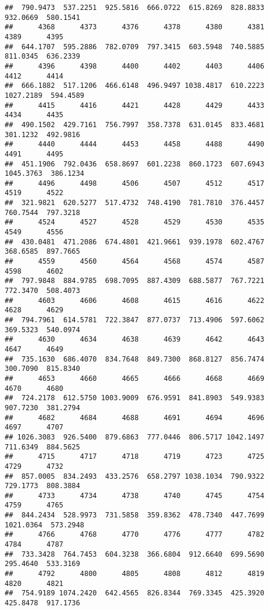 \documentclass[
]{article}
\begin{document}
\begin{verbatim}
##  790.9473  537.2251  925.5816  666.0722  615.8269  828.8833  932.0669  580.1541 
##      4368      4373      4376      4378      4380      4381      4389      4395 
##  644.1707  595.2886  782.0709  797.3415  603.5948  740.5885  811.0345  636.2339 
##      4396      4398      4400      4402      4403      4406      4412      4414 
##  666.1882  517.1206  466.6148  496.9497 1038.4817  610.2223 1027.2189  594.4589 
##      4415      4416      4421      4428      4429      4433      4434      4435 
##  490.1502  429.7161  756.7997  358.7378  631.0145  833.4681  301.1232  492.9816 
##      4440      4444      4453      4458      4488      4490      4491      4495 
##  451.1906  792.0436  658.8697  601.2238  860.1723  607.6943 1045.3763  386.1234 
##      4496      4498      4506      4507      4512      4517      4519      4522 
##  321.9821  620.5277  517.4732  748.4190  781.7810  376.4457  760.7544  797.3218 
##      4524      4527      4528      4529      4530      4535      4549      4556 
##  430.0481  471.2086  674.4801  421.9661  939.1978  602.4767  368.6585  897.7665 
##      4559      4560      4564      4568      4574      4587      4598      4602 
##  797.9848  884.9785  698.7095  887.4309  688.5877  767.7221  772.3470  508.4073 
##      4603      4606      4608      4615      4616      4622      4628      4629 
##  794.7961  614.5781  722.3847  877.0737  713.4906  597.6062  369.5323  540.0974 
##      4630      4634      4638      4639      4642      4643      4647      4649 
##  735.1630  686.4070  834.7648  849.7300  868.8127  856.7474  300.7090  815.8340 
##      4653      4660      4665      4666      4668      4669      4670      4680 
##  724.2178  612.5750 1003.9009  676.9591  841.8903  549.9383  907.7230  381.2794 
##      4682      4684      4688      4691      4694      4696      4697      4707 
## 1026.3083  926.5400  879.6863  777.0446  806.5717 1042.1497  711.6349  884.5625 
##      4715      4717      4718      4719      4723      4725      4729      4732 
##  857.0005  834.2493  433.2576  658.2797 1038.1034  790.9322  729.1773  808.3884 
##      4733      4734      4738      4740      4745      4754      4759      4765 
##  844.2434  528.9973  731.5858  359.8362  478.7340  447.7699 1021.0364  573.2948 
##      4766      4768      4770      4776      4777      4782      4784      4787 
##  733.3428  764.7453  604.3238  366.6804  912.6640  699.5690  295.4640  533.3169 
##      4792      4800      4805      4808      4812      4819      4820      4821 
##  754.9189 1074.2420  642.4565  826.8344  769.3345  425.3920  425.8478  917.1736 

\end{verbatim}
\end{document}
